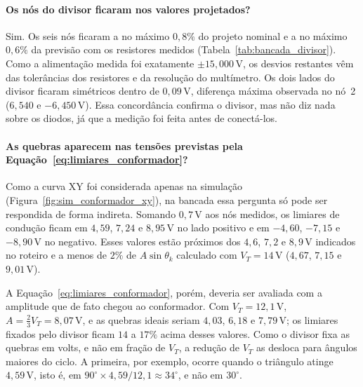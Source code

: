\documentclass[11pt,a4paper]{article}
\begin{document}
\paragraph{Os nós do divisor ficaram nos valores projetados?}

Sim. Os seis nós ficaram a no máximo $0{,}8\%$ do projeto nominal e a no máximo $0{,}6\%$ da previsão com os resistores medidos (Tabela~\ref{tab:bancada_divisor}). Como a alimentação medida foi exatamente $\pm15{,}000\,\text{V}$, os desvios restantes vêm das tolerâncias dos resistores e da resolução do multímetro. Os dois lados do divisor ficaram simétricos dentro de $0{,}09\,\text{V}$, diferença máxima observada no nó~2 ($6{,}540$ e $-6{,}450\,\text{V}$). Essa concordância confirma o divisor, mas não diz nada sobre os diodos, já que a medição foi feita antes de conectá-los.

\paragraph{As quebras aparecem nas tensões previstas pela Equação~\ref{eq:limiares_conformador}?}

Como a curva XY foi considerada apenas na simulação (Figura~\ref{fig:sim_conformador_xy}), na bancada essa pergunta só pode ser respondida de forma indireta. Somando $0{,}7\,\text{V}$ aos nós medidos, os limiares de condução ficam em $4{,}59$, $7{,}24$ e $8{,}95\,\text{V}$ no lado positivo e em $-4{,}60$, $-7{,}15$ e $-8{,}90\,\text{V}$ no negativo. Esses valores estão próximos dos $4{,}6$, $7{,}2$ e $8{,}9\,\text{V}$ indicados no roteiro e a menos de $2\%$ de $A\sin\theta_k$ calculado com $V_T = 14\,\text{V}$ ($4{,}67$, $7{,}15$ e $9{,}01\,\text{V}$).

A Equação~\ref{eq:limiares_conformador}, porém, deveria ser avaliada com a amplitude que de fato chegou ao conformador. Com $V_T = 12{,}1\,\text{V}$, $A = \tfrac{2}{3}V_T = 8{,}07\,\text{V}$, e as quebras ideais seriam $4{,}03$, $6{,}18$ e $7{,}79\,\text{V}$; os limiares fixados pelo divisor ficam $14$ a $17\%$ acima desses valores. Como o divisor fixa as quebras em volts, e não em fração de $V_T$, a redução de $V_T$ as desloca para ângulos maiores do ciclo. A primeira, por exemplo, ocorre quando o triângulo atinge $4{,}59\,\text{V}$, isto é, em $90^\circ \times 4{,}59/12{,}1 \approx 34^\circ$, e não em $30^\circ$.
\end{document}
